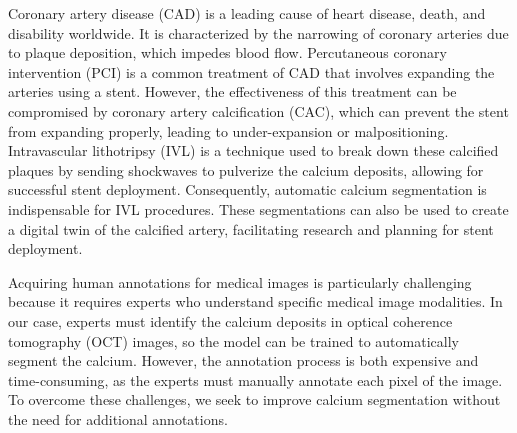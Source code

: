 \documentclass[a4paper,11pt,oneside]{report}
\begin{document}

Coronary artery disease (CAD) is a leading cause of heart disease, death, and disability worldwide. It is characterized by the narrowing of coronary arteries due to plaque deposition, which impedes blood flow. Percutaneous coronary intervention (PCI) is a common treatment of CAD that involves expanding the arteries using a stent. However, the effectiveness of this treatment can be compromised by coronary artery calcification (CAC), which can prevent the stent from expanding properly, leading to under-expansion or malpositioning. Intravascular lithotripsy (IVL) is a technique used to break down these calcified plaques by sending shockwaves to pulverize the calcium deposits, allowing for successful stent deployment. Consequently, automatic calcium segmentation is indispensable for IVL procedures. These segmentations can also be used to create a digital twin of the calcified artery, facilitating research and planning for stent deployment.


Acquiring human annotations for medical images is particularly challenging because it requires experts who understand specific medical image modalities. In our case, experts must identify the calcium deposits in optical coherence tomography (OCT) images, so the model can be trained to automatically segment the calcium. However, the annotation process is both expensive and time-consuming, as the experts must manually annotate each pixel of the image. To overcome these challenges, we seek to improve calcium segmentation without the need for additional annotations.
\end{document}
